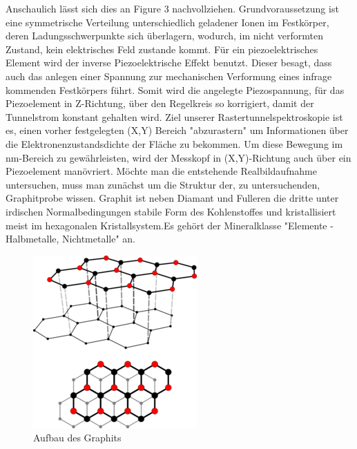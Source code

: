 \documentclass[10pt,a4paper]{article}
\begin{document}
Anschaulich lässt sich dies an Figure 3 nachvollziehen. Grundvoraussetzung ist eine symmetrische Verteilung unterschiedlich geladener Ionen im Festkörper, deren Ladungsschwerpunkte sich überlagern, wodurch, im nicht verformten Zustand, kein elektrisches Feld zustande kommt. Für ein piezoelektrisches Element wird der inverse Piezoelektrische Effekt benutzt. Dieser besagt, dass auch das anlegen einer Spannung zur mechanischen Verformung eines infrage kommenden Festkörpers führt. Somit wird die angelegte Piezospannung, für das Piezoelement in Z-Richtung, über den Regelkreis so korrigiert, damit der Tunnelstrom konstant gehalten wird. Ziel unserer Rastertunnelspektroskopie ist es, einen vorher festgelegten (X,Y) Bereich "abzurastern" um Informationen über die Elektronenzustandsdichte der Fläche zu bekommen. Um diese Bewegung im nm-Bereich zu gewährleisten, wird der Messkopf in (X,Y)-Richtung auch über ein Piezoelement manövriert. Möchte man die entstehende Realbildaufnahme untersuchen, muss man zunächst um die Struktur der, zu untersuchenden, Graphitprobe wissen.
Graphit ist neben Diamant und Fulleren die dritte unter irdischen Normalbedingungen stabile Form des Kohlenstoffes und kristallisiert meist im hexagonalen Kristallsystem.Es gehört der Mineralklasse "Elemente - Halbmetalle, Nichtmetalle" an. 
\begin{figure}[h]
	\includegraphics[scale = 1.1]{Graphit.png}
	\centering
	\caption{Aufbau des Graphits}
	\label{diagramm_aufspaltung}
\end{figure}
\end{document}
